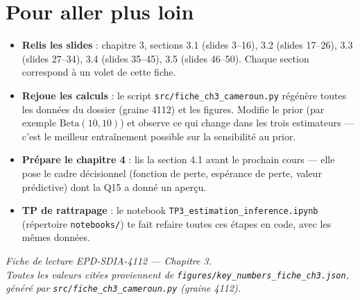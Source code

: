 \documentclass[11pt,a4paper]{article}
\begin{document}
\section{Pour aller plus loin}

\begin{contexte}
\begin{itemize}[leftmargin=4mm, itemsep=1mm]
  \item \textbf{Relis les slides} : chapitre 3, sections 3.1 (slides 3--16),
        3.2 (slides 17--26), 3.3 (slides 27--34), 3.4 (slides 35--45),
        3.5 (slides 46--50). Chaque section correspond à un volet de cette fiche.
  \item \textbf{Rejoue les calculs} : le script \texttt{src/fiche\_ch3\_cameroun.py}
        régénère toutes les données du dossier (graine 4112) et les figures.
        Modifie le prior (par exemple $\text{Beta}(10, 10)$) et observe ce qui
        change dans les trois estimateurs --- c'est le meilleur entraînement
        possible sur la sensibilité au prior.
  \item \textbf{Prépare le chapitre 4} : lis la section 4.1 avant le prochain
        cours --- elle pose le cadre décisionnel (fonction de perte, espérance
        de perte, valeur prédictive) dont la Q15 a donné un aperçu.
  \item \textbf{TP de rattrapage} : le notebook \texttt{TP3\_estimation\_inference.ipynb}
        (répertoire \texttt{notebooks/}) te fait refaire toutes ces étapes en
        code, avec les mêmes données.
\end{itemize}
\end{contexte}

\vspace{4mm}
\begin{center}
{\small\itshape Fiche de lecture EPD-SDIA-4112 --- Chapitre 3.\\
Toutes les valeurs citées proviennent de \texttt{figures/key\_numbers\_fiche\_ch3.json},
généré par \texttt{src/fiche\_ch3\_cameroun.py} (graine 4112).}
\end{center}
\end{document}
